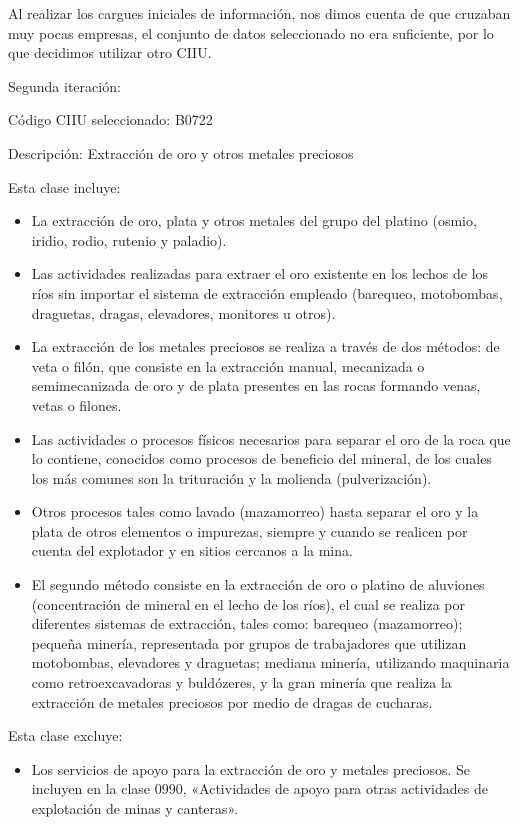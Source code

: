 \documentclass[
  11pt,
]{book}
\begin{document}
Al realizar los cargues iniciales de información, nos dimos cuenta de
que cruzaban muy pocas empresas, el conjunto de datos seleccionado no
era suficiente, por lo que decidimos utilizar otro CIIU.

Segunda iteración:

Código CIIU seleccionado: B0722

Descripción: Extracción de oro y otros metales preciosos

Esta clase incluye:

\begin{itemize}
\item La extracción de oro, plata y otros metales del grupo del platino (osmio, iridio, rodio, rutenio y paladio).
\item Las actividades realizadas para extraer el oro existente en los lechos de los ríos sin importar el sistema de extracción empleado (barequeo, motobombas, draguetas, dragas, elevadores, monitores u otros).
\item La extracción de los metales preciosos se realiza a través de dos métodos: de veta o filón, que consiste en la extracción manual, mecanizada o semimecanizada de oro y de plata presentes en las rocas formando venas, vetas o filones.
\item Las actividades o procesos físicos necesarios para separar el oro de la roca que lo contiene, conocidos como procesos de beneficio del mineral, de los cuales los más comunes son la trituración y la molienda (pulverización).
\item Otros procesos tales como lavado (mazamorreo) hasta separar el oro y la plata de otros elementos o impurezas, siempre y cuando se realicen por cuenta del explotador y en sitios cercanos a la mina.
\item El segundo método consiste en la extracción de oro o platino de aluviones (concentración de mineral en el lecho de los ríos), el cual se realiza por diferentes sistemas de extracción, tales como: barequeo (mazamorreo); pequeña minería, representada por grupos de trabajadores que utilizan motobombas, elevadores y draguetas; mediana minería, utilizando maquinaria como retroexcavadoras y buldózeres, y la gran minería que realiza la extracción de metales preciosos por medio de dragas de cucharas.
\end{itemize}

Esta clase excluye:

\begin{itemize}
\item Los servicios de apoyo para la extracción de oro y metales preciosos. Se incluyen en la clase 0990, «Actividades de apoyo para otras actividades de explotación de minas y canteras».
\end{itemize}
\end{document}
